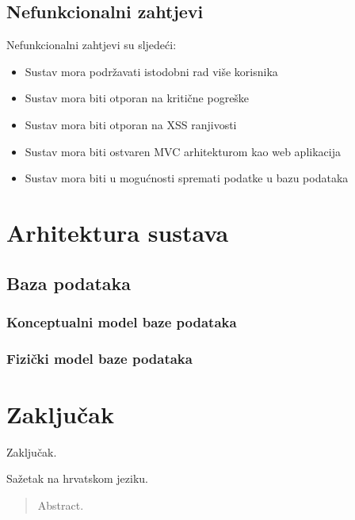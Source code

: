 \documentclass[times, utf8, zavrsni]{fer}
\begin{document}
\section{Nefunkcionalni zahtjevi}
Nefunkcionalni zahtjevi su sljedeći:

\begin{itemize}
	\item Sustav mora podržavati istodobni rad više korisnika
	\item Sustav mora biti otporan na kritične pogreške
	\item Sustav mora biti otporan na XSS ranjivosti
	\item Sustav mora biti ostvaren MVC arhitekturom kao web aplikacija
	\item Sustav mora biti u mogućnosti spremati podatke u bazu podataka
\end{itemize}

\chapter{Arhitektura sustava}
\section{Baza podataka}
\subsection{Konceptualni model baze podataka}

\subsection{Fizički model baze podataka}


\chapter{Zaključak}
Zaključak.




\begin{sazetak}
	Sažetak na hrvatskom jeziku.
		
\end{sazetak}

\begin{abstract}
	Abstract.
		
\end{abstract}
\end{document}
